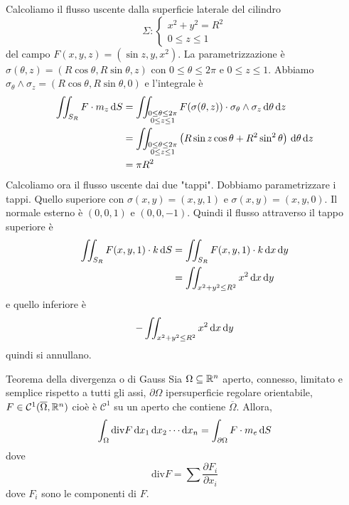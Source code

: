 \documentclass[a4paper]{article}
\begin{document}
\begin{snippetexample}{}
    Calcoliamo il flusso uscente dalla superficie laterale del cilindro
    \[
        \Sigma \colon \begin{cases}
            x^2 + y^2 = R^2 \\
            0 \leq z \leq 1
        \end{cases}
    \]
    del campo \(F(x,y,z) = (\sin z, y, x^2)\).
    La parametrizzazione è \(\sigma(\theta, z) = (R \cos\theta, R \sin \theta, z)\)
    con \(0 \leq \theta \leq 2\pi\) e \(0 \leq z \leq 1\).
    Abbiamo \(\sigma_\theta \wedge \sigma_z = (R \cos\theta, R \sin\theta, 0)\)
    e l'integrale è
    \begin{align*}
        \iint_{S_R} F\cdot m_z\,\text d S &=
        \iint_{\substack{0 \leq \theta \leq 2\pi \\ 0 \leq z \leq 1}}
        F(\sigma(\theta, z)) \cdot \sigma_\theta \wedge \sigma_z \,\text d \theta \,\text d z \\
        &= \iint_{\substack{0 \leq \theta \leq 2\pi \\ 0 \leq z \leq 1}}
        \left(R \sin z \cos\theta + R^2 \sin^2 \theta\right) \,\text d \theta \,\text d z \\
        &= \pi R^2
    \end{align*}
    Calcoliamo ora il flusso uscente dai due "tappi".
    Dobbiamo parametrizzare i tappi. Quello superiore con
    \(\sigma(x,y) = (x,y,1)\) e \(\sigma(x,y) = (x,y,0)\).
    Il normale esterno è \((0,0,1)\) e \((0,0,-1)\).
    Quindi il flusso attraverso il tappo superiore è
    \begin{align*}
        \iint_{S_R} F(x,y,1)\cdot k\,\text d S &= 
        \iint_{S_R} F(x,y,1)\cdot k\,\text d x \,\text d y \\
        &= \iint_{x^2 + y^2 \leq R^2} x^2 \,\text d x \,\text d y
    \end{align*}
    e quello inferiore è
    \[
        -\iint_{x^2 + y^2 \leq R^2} x^2 \,\text d x \,\text d y
    \]
    quindi si annullano.
\end{snippetexample}

\begin{snippettheorem}{Teorema della divergenza o di Gauss}
    Sia \(\Omega \subseteq \mathbb{R}^n\) aperto, connesso,
    limitato e semplice rispetto a tutti gli assi,
    \(\partial \Omega\) ipersuperficie regolare orientabile,
    \(F \in \mathcal C^1(\overline \Omega, \mathbb{R}^n)\)
    cioè è \(\mathcal C^1\) su un aperto che contiene \(\overline \Omega\).
    Allora,
    \[
        \int_\Omega \text{div} F
        \,\text d x_1 \, \text d x_2 \cdots \text d x_n
        = \int_{\partial \Omega} F \cdot m_e \, \text d S
    \]
    dove \[
        \text{div} F = \sum \frac{\partial F_i}{\partial x_i}
    \]
    dove \(F_i\) sono le componenti di \(F\).
\end{snippettheorem}
\end{document}
